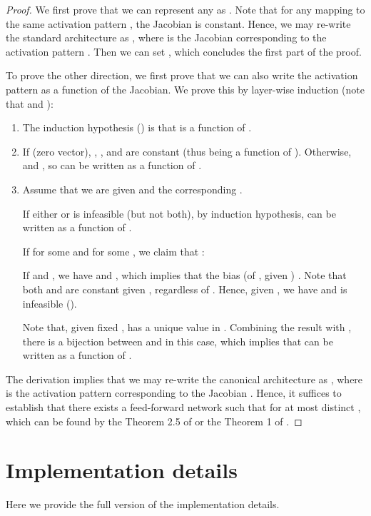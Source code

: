 \documentclass{article} \usepackage{iclr2020_conference,times}
\begin{document}
\begin{proof}
We first prove that we can represent any  as . Note that for any  mapping to the same activation pattern , the Jacobian  is constant. Hence, we may re-write the standard architecture  as , where  is the Jacobian corresponding to the activation pattern . Then we can set , which concludes the first part of the proof. 

To prove the other direction, we first prove that we can also write the activation pattern as a function of the Jacobian. We prove this by layer-wise induction (note that  and ):
\begin{enumerate}[leftmargin=4mm]
    \item The induction hypothesis () is that  is a function of .\!\!\!\!\!
    \item If  (zero vector), , , and  are constant (thus being a function of ). Otherwise,  and , so  can be written as a function of .\!\!\!\!\!
    \item Assume that we are given  and the corresponding .
    
    If either  or  is infeasible (but not both), by induction hypothesis,  can be written as a function of . 
    
    If  for some  and  for some , we claim that :
    
    If  and , we have  and , which implies that the bias (of , given ) . Note that both  and  are constant given , regardless of . Hence, given , we have  and  is infeasible (). 


    Note that, given fixed ,  has a unique value in . Combining the result  with , there is a bijection between  and  in this case, which implies that  can be written as a function of .\!\!\!
\end{enumerate}

The derivation implies that we may re-write the canonical architecture  as , where  is the activation pattern corresponding to the Jacobian . Hence, it suffices to establish that there exists a feed-forward network  such that  for at most  distinct , which can be found by the Theorem 2.5 of \citet{hornik1989multilayer} or the Theorem 1 of \citet{zhang2016understanding}.
\end{proof}

\vspace{-1mm}
\section{Implementation details}\label{appendix:exp:implementation}
\vspace{-1mm}
Here we provide the full version of the implementation details.
\end{document}
